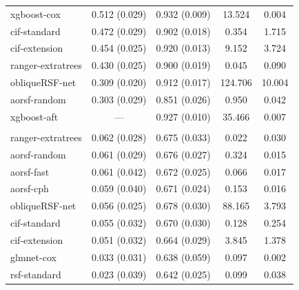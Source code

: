 \documentclass[12pt]{article}\usepackage[]{graphicx}\usepackage[]{xcolor}
\newenvironment{knitrout}{}{} %
\begin{document}
\begin{knitrout}
\begin{longtable}[t]{lcccc}
\hspace{1em}xgboost-cox & 0.512 (0.029) & 0.932 (0.009) & 13.524 & 0.004\\
\hspace{1em}cif-standard & 0.472 (0.029) & 0.902 (0.018) & 0.354 & 1.715\\
\hspace{1em}cif-extension & 0.454 (0.025) & 0.920 (0.013) & 9.152 & 3.724\\
\hspace{1em}ranger-extratrees & 0.430 (0.025) & 0.900 (0.019) & 0.045 & 0.090\\
\hspace{1em}obliqueRSF-net & 0.309 (0.020) & 0.912 (0.017) & 124.706 & 10.004\\
\hspace{1em}aorsf-random & 0.303 (0.029) & 0.851 (0.026) & 0.950 & 0.042\\
\hspace{1em}xgboost-aft & --- & 0.927 (0.010) & 35.466 & 0.007\\
\addlinespace[0.3em]
\multicolumn{5}{l}{\textit{\textbf{NCCTG Lung Cancer; death, n = 228, p = 9}}}\\
\hline
\hspace{1em}ranger-extratrees & 0.062 (0.028) & 0.675 (0.033) & 0.022 & 0.030\\
\hspace{1em}aorsf-random & 0.061 (0.029) & 0.676 (0.027) & 0.324 & 0.015\\
\hspace{1em}aorsf-fast & 0.061 (0.042) & 0.672 (0.025) & 0.066 & 0.017\\
\hspace{1em}aorsf-cph & 0.059 (0.040) & 0.671 (0.024) & 0.153 & 0.016\\
\hspace{1em}obliqueRSF-net & 0.056 (0.025) & 0.678 (0.030) & 88.165 & 3.793\\
\hspace{1em}cif-standard & 0.055 (0.032) & 0.670 (0.030) & 0.128 & 0.254\\
\hspace{1em}cif-extension & 0.051 (0.032) & 0.664 (0.029) & 3.845 & 1.378\\
\hspace{1em}glmnet-cox & 0.033 (0.031) & 0.638 (0.059) & 0.097 & 0.002\\
\hspace{1em}rsf-standard & 0.023 (0.039) & 0.642 (0.025) & 0.099 & 0.038\\

\end{longtable}
\end{knitrout}
\end{document}
